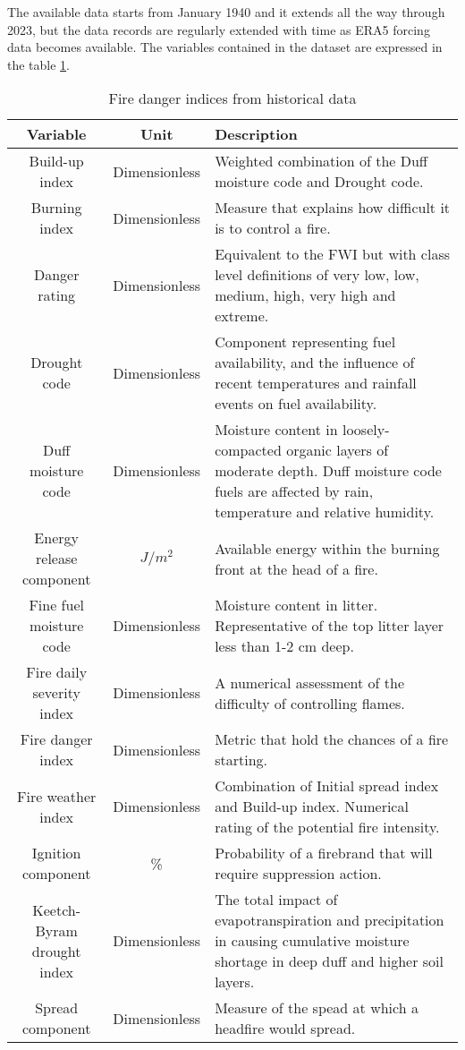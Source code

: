The available data starts from January 1940 and it extends all the way through 2023, but the data records are regularly extended with time as ERA5 forcing data becomes available. The variables contained in the dataset are expressed in the table \ref{copernicus_danger_indices}.


\begin{table}[h!]

\caption{Fire danger indices from historical data}
\label{copernicus_danger_indices}
\centering
\small
\begin{tabular}{|c|c|p{7.5cm}|} %
\hline
\textbf{Variable} & \textbf{Unit} & \textbf{Description}\\
\hline
Build-up index & Dimensionless & Weighted combination of the Duff moisture code and Drought code. \\
\hline
Burning index & Dimensionless & Measure that explains how difficult it is to control a fire. \\
\hline
Danger rating & Dimensionless & Equivalent to the FWI but with class level definitions of very low, low, medium, high, very high and extreme. \\
\hline
Drought code & Dimensionless & Component representing fuel availability, and the influence of recent temperatures and rainfall events on fuel availability. \\
\hline
Duff moisture code & Dimensionless & Moisture content in loosely-compacted organic layers of moderate depth. Duff moisture code fuels are affected by rain, temperature and relative humidity. \\
\hline
Energy release component & $J/m^2$ & Available energy within the burning front at the head of a fire. \\
\hline
Fine fuel moisture code & Dimensionless &  Moisture content in litter. Representative of the top litter layer less than 1-2 cm deep. \\
\hline
Fire daily severity index & Dimensionless &  A numerical assessment of the difficulty of controlling flames. \\
\hline
Fire danger index & Dimensionless &  Metric that hold the chances of a fire starting. \\
\hline
Fire weather index & Dimensionless &  Combination of Initial spread index and Build-up index. Numerical rating of the potential fire intensity. \\
\hline
Ignition component & \% &  Probability of a firebrand that will require suppression action. \\
\hline
Keetch-Byram drought index & Dimensionless &  The total impact of evapotranspiration and precipitation in causing cumulative moisture shortage in deep duff and higher soil layers. \\
\hline
Spread component & Dimensionless &  Measure of the spead at which a headfire would spread. \\
\hline
\end{tabular}
\end{table}



